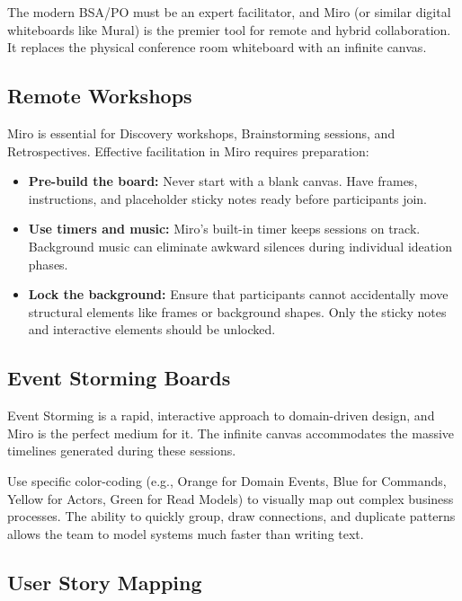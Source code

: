 \documentclass[
  11pt,
  openany,
  oneside]{book}
\providecommand{\tightlist}{%
  \setlength{\itemsep}{0pt}\setlength{\parskip}{0pt}}
\begin{document}
The modern BSA/PO must be an expert facilitator, and Miro (or similar
digital whiteboards like Mural) is the premier tool for remote and
hybrid collaboration. It replaces the physical conference room
whiteboard with an infinite canvas.

\subsection{Remote Workshops}\label{remote-workshops}

Miro is essential for Discovery workshops, Brainstorming sessions, and
Retrospectives. Effective facilitation in Miro requires preparation:

\begin{itemize}
\tightlist
\item
  \textbf{Pre-build the board:} Never start with a blank canvas. Have
  frames, instructions, and placeholder sticky notes ready before
  participants join.
\item
  \textbf{Use timers and music:} Miro's built-in timer keeps sessions on
  track. Background music can eliminate awkward silences during
  individual ideation phases.
\item
  \textbf{Lock the background:} Ensure that participants cannot
  accidentally move structural elements like frames or background
  shapes. Only the sticky notes and interactive elements should be
  unlocked.
\end{itemize}

\subsection{Event Storming Boards}\label{event-storming-boards}

Event Storming is a rapid, interactive approach to domain-driven design,
and Miro is the perfect medium for it. The infinite canvas accommodates
the massive timelines generated during these sessions.

Use specific color-coding (e.g., Orange for Domain Events, Blue for
Commands, Yellow for Actors, Green for Read Models) to visually map out
complex business processes. The ability to quickly group, draw
connections, and duplicate patterns allows the team to model systems
much faster than writing text.

\subsection{User Story Mapping}\label{user-story-mapping}
\end{document}

